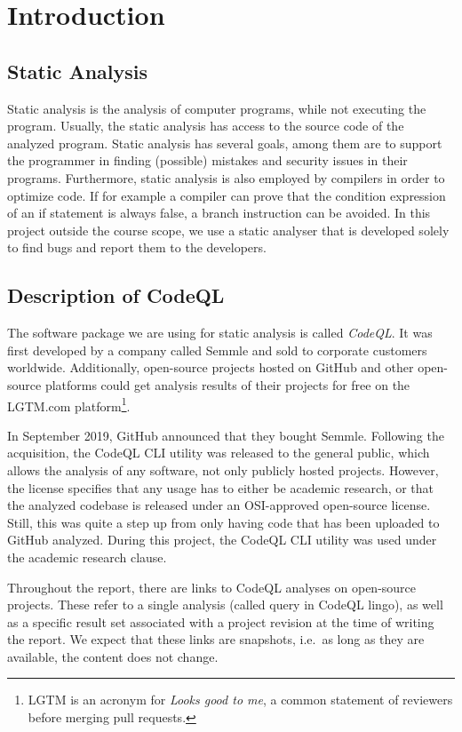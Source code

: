 \section{Introduction}
\subsection{Static Analysis}
Static analysis is the analysis of computer programs, while not executing the program.
Usually, the static analysis has access to the source code of the analyzed program.
Static analysis has several goals, among them are to support the programmer in finding (possible) mistakes and
security issues in their programs.
Furthermore, static analysis is also employed by compilers in order to optimize code.
If for example a compiler can prove that the condition expression of an if statement is always false,
a branch instruction can be avoided.
In this project outside the course scope, we use a static analyser that is developed
solely to find bugs and report them to the developers.

\subsection{Description of CodeQL}
The software package we are using for static analysis is called \emph{CodeQL}.
It was first developed by a company called Semmle and sold to corporate customers worldwide.
Additionally, open-source projects hosted on GitHub and other open-source platforms could
get analysis results of their projects for free on the LGTM.com platform\footnote{LGTM 
is an acronym for \emph{Looks good to me}, a common statement of reviewers before merging
pull requests.}.

In September 2019, GitHub announced that they bought Semmle.
Following the acquisition, the CodeQL CLI utility was released to the general public,
which allows the analysis of any software, not only publicly hosted projects.
However, the license specifies that any usage has to either be academic research,
or that the analyzed codebase is released under an OSI-approved open-source license.
Still, this was quite a step up from only having code that has been uploaded to
GitHub analyzed.
During this project, the CodeQL CLI utility was used under the academic research clause.

Throughout the report, there are links to CodeQL analyses on open-source projects.
These refer to a single analysis (called query in CodeQL lingo), as well as a specific result
set associated with a project revision at the time of writing the report.
We expect that these links are snapshots, i.e.\ as long as they are available,
the content does not change.


